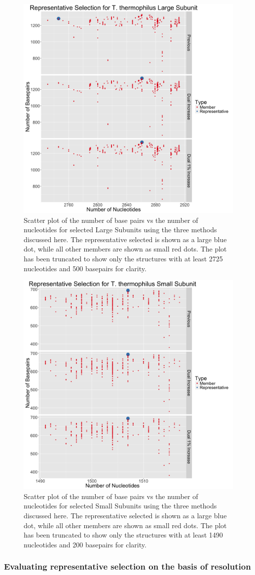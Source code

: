 \begin{figure}
  \includegraphics[width=0.5\linewidth]{chapter-4/figs/tt-lsu-rep}
  \caption{Scatter plot of the number of base pairs vs the number of nucleotides
    for selected \TT{} Large Subunits using the three methods
    discussed here. The representative selected is shown as a large blue dot,
    while all other members are shown as small red dots. The plot has been
    truncated to show only the structures with at least 2725 nucleotides and 500
  basepairs for clarity.}
  \label{fig:tt-lsu-rep}
\end{figure}

\begin{figure}
  \includegraphics[width=0.5\linewidth]{chapter-4/figs/tt-ssu-rep}
  \caption{Scatter plot of the number of base pairs vs the number of nucleotides
    for selected \TT{} Small Subunits using the three methods
    discussed here. The representative selected is shown as a large blue dot,
    while all other members are shown as small red dots. The plot has been
    truncated to show only the structures with at least 1490 nucleotides and 200
  basepairs for clarity.}
  \label{fig:tt-ssu-rep}
\end{figure}

\subsubsection{Evaluating representative selection on the basis of resolution}

